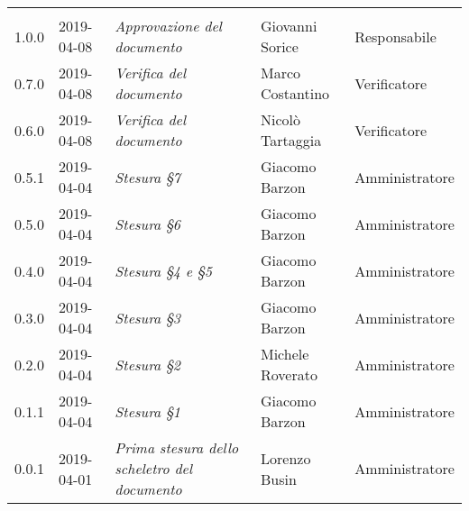 \newpage 
\section*{}
\begin{longtable}{C{2cm}|C{2.5cm}|C{4.5cm}|C{2.5cm}|C{3cm}}
	
	 &  &  &  &   \\
	\endhead
	
	1.0.0 & 2019-04-08 &  \emph{Approvazione del documento} & Giovanni Sorice  & Responsabile\\
	\hline
	
	0.7.0 & 2019-04-08 & \emph{Verifica del documento} & Marco Costantino & Verificatore \\
	\hline
	
	0.6.0 & 2019-04-08 & \emph{Verifica del documento} & Nicolò Tartaggia & Verificatore \\
	\hline
	
	0.5.1 & 2019-04-04 & \emph{Stesura §7} & Giacomo Barzon & Amministratore \\
	\hline
	
	0.5.0 & 2019-04-04 & \emph{Stesura §6} & Giacomo Barzon & Amministratore \\
	\hline
	
	0.4.0 & 2019-04-04 & \emph{Stesura §4 e §5} & Giacomo Barzon & Amministratore \\
	\hline
	
	0.3.0 & 2019-04-04 & \emph{Stesura §3} & Giacomo Barzon & Amministratore \\
	\hline
	
	0.2.0 & 2019-04-04 & \emph{Stesura §2} & Michele Roverato & Amministratore \\
	\hline
	
	0.1.1 & 2019-04-04 & \emph{Stesura §1} & Giacomo Barzon & Amministratore \\
	\hline
	
	0.0.1 & 2019-04-01 & \emph{Prima stesura dello scheletro del documento} & Lorenzo Busin & Amministratore \\
	
\end{longtable}


\clearpage